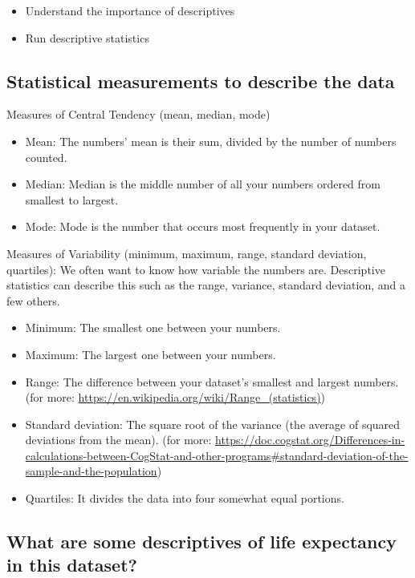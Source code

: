 \documentclass[
]{book}
\begin{document}
\begin{itemize}
\item
  Understand the importance of descriptives
\item
  Run descriptive statistics
\end{itemize}

\hypertarget{statistical-measurements-to-describe-the-data}{%
\subsection{Statistical measurements to describe the data}\label{statistical-measurements-to-describe-the-data}}

Measures of Central Tendency (mean, median, mode)

\begin{itemize}
\item
  Mean: The numbers' mean is their sum, divided by the number of numbers counted.
\item
  Median: Median is the middle number of all your numbers ordered from smallest to largest.
\item
  Mode: Mode is the number that occurs most frequently in your dataset.
\end{itemize}

Measures of Variability (minimum, maximum, range, standard deviation, quartiles): We often want to know how variable the numbers are. Descriptive statistics can describe this such as the range, variance, standard deviation, and a few others.

\begin{itemize}
\item
  Minimum: The smallest one between your numbers.
\item
  Maximum: The largest one between your numbers.
\item
  Range: The difference between your dataset's smallest and largest numbers. (for more: \url{https://en.wikipedia.org/wiki/Range_(statistics)})
\item
  Standard deviation: The square root of the variance (the average of squared deviations from the mean). (for more: \url{https://doc.cogstat.org/Differences-in-calculations-between-CogStat-and-other-programs\#standard-deviation-of-the-sample-and-the-population})
\item
  Quartiles: It divides the data into four somewhat equal portions.
\end{itemize}

\hypertarget{what-are-some-descriptives-of-life-expectancy-in-this-dataset}{%
\subsection{What are some descriptives of life expectancy in this dataset?}\label{what-are-some-descriptives-of-life-expectancy-in-this-dataset}}
\end{document}
